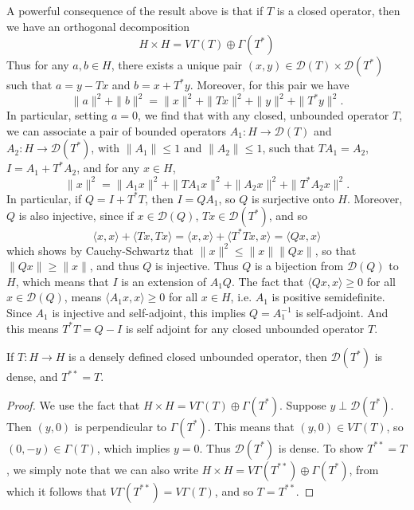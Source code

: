A powerful consequence of the result above is that if $T$ is a closed operator, then we have an orthogonal decomposition
%
\[ H \times H = V \Gamma(T) \oplus \Gamma(T^*) \]
%
Thus for any $a,b \in H$, there exists a unique pair $(x,y) \in \mathcal{D}(T) \times \mathcal{D}(T^*)$ such that $a = y - Tx$ and $b = x + T^* y$. Moreover, for this pair we have
%
\[ \| a \|^2 + \| b \|^2 = \| x \|^2 + \| Tx \|^2 + \| y \|^2 + \| T^* y \|^2. \]
%
In particular, setting $a = 0$, we find that with any closed, unbounded operator $T$, we can associate a pair of bounded operators $A_1: H \to \mathcal{D}(T)$ and $A_2: H \to \mathcal{D}(T^*)$, with $\| A_1 \| \leq 1$ and $\| A_2 \| \leq 1$, such that $TA_1 = A_2$, $I = A_1 + T^* A_2$, and for any $x \in H$,
%
\[ \| x \|^2 = \| A_1 x \|^2 + \| TA_1 x \|^2 + \| A_2 x \|^2 + \| T^* A_2 x \|^2. \]
%
In particular, if $Q = I + T^*T$, then $I = QA_1$, so $Q$ is surjective onto $H$. Moreover, $Q$ is also injective, since if $x \in \mathcal{D}(Q)$, $Tx \in \mathcal{D}(T^*)$, and so
%
\[ \langle x, x \rangle + \langle Tx, Tx \rangle = \langle x, x \rangle + \langle T^*Tx, x \rangle = \langle Qx, x \rangle \]
%
which shows by Cauchy-Schwartz that $\| x \|^2 \leq \| x \| \| Qx \|$, so that $\| Qx \| \geq \| x \|$, and thus $Q$ is injective. Thus $Q$ is a bijection from $\mathcal{D}(Q)$ to $H$, which means that $I$ is an extension of $A_1Q$. The fact that $\langle Qx, x \rangle \geq 0$ for all $x \in \mathcal{D}(Q)$, means $\langle A_1 x, x \rangle \geq 0$ for all $x \in H$, i.e. $A_1$ is positive semidefinite. Since $A_1$ is injective and self-adjoint, this implies $Q = A_1^{-1}$ is self-adjoint. And this means $T^*T = Q - I$ is self adjoint for any closed unbounded operator $T$.

\begin{theorem}
    If $T: H \to H$ is a densely defined closed unbounded operator, then $\mathcal{D}(T^*)$ is dense, and $T^{**} = T$.
\end{theorem}
\begin{proof}
    We use the fact that $H \times H = V \Gamma(T) \oplus \Gamma(T^*)$. Suppose $y \perp \mathcal{D}(T^*)$. Then $(y,0)$ is perpendicular to $\Gamma(T^*)$. This means that $(y,0) \in V \Gamma(T)$, so $(0,-y) \in \Gamma(T)$, which implies $y = 0$. Thus $\mathcal{D}(T^*)$ is dense. To show $T^{**} = T$, we simply note that we can also write $H \times H = V \Gamma(T^{**}) \oplus \Gamma(T^*)$, from which it follows that $V \Gamma(T^{**}) = V \Gamma(T)$, and so $T = T^{**}$.
\end{proof}


